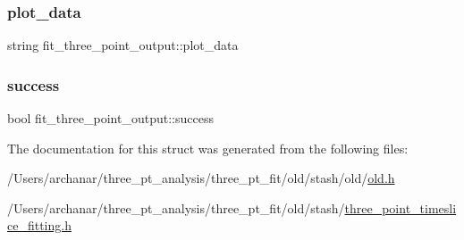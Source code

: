 \mbox{\label{structfit__three__point__output_ae49fa22b64fe79efc2f36254b92c3810}} 
\subsubsection{\texorpdfstring{plot\_data}{plot\_data}}
{\footnotesize\ttfamily string fit\+\_\+three\+\_\+point\+\_\+output\+::plot\+\_\+data}

\mbox{\label{structfit__three__point__output_a3b9d0b643265aad50cb4153703b3d850}} 
\subsubsection{\texorpdfstring{success}{success}}
{\footnotesize\ttfamily bool fit\+\_\+three\+\_\+point\+\_\+output\+::success}



The documentation for this struct was generated from the following files\+:\begin{DoxyCompactItemize}
\item 
/\+Users/archanar/three\+\_\+pt\+\_\+analysis/three\+\_\+pt\+\_\+fit/old/stash/old/\mbox{\hyperlink{old_8h}{old.\+h}}\item 
/\+Users/archanar/three\+\_\+pt\+\_\+analysis/three\+\_\+pt\+\_\+fit/old/stash/\mbox{\hyperlink{old_2stash_2three__point__timeslice__fitting_8h}{three\+\_\+point\+\_\+timeslice\+\_\+fitting.\+h}}\end{DoxyCompactItemize}
